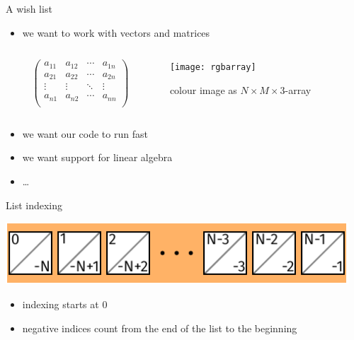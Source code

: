\documentclass[svgnames]{beamer}
\begin{document}
\begin{frame}{A wish list}
 \begin{itemize}
  \item we want to work with vectors and matrices
 \end{itemize}

 \begin{columns}
  \begin{column}{0.55\textwidth}
   \begin{displaymath}
    \begin{pmatrix}
     a_{11} & a_{12} & \cdots & a_{1n}\\
     a_{21} & a_{22} & \cdots & a_{2n}\\
     \vdots & \vdots & \ddots & \vdots\\
     a_{n1} & a_{n2} & \cdots & a_{nn}\\
    \end{pmatrix}
   \end{displaymath}
  \end{column}%
  \begin{column}{0.45\textwidth}
   \texttt{[image: rgbarray]}

   colour image as $N\times M\times3$-array
  \end{column}
 \end{columns}

 \begin{itemize}
  \item we want our code to run fast
  \item we want support for linear algebra
  \item \dots 
 \end{itemize}
\end{frame}

\begin{frame}{List indexing}
 \begin{center}
  \includegraphics[width=0.96\textwidth]{listindexing2}
 \end{center}
 \begin{itemize}
  \item indexing starts at 0
  \item negative indices count from the end of the list to the beginning
 \end{itemize}
\end{frame}
\end{document}
